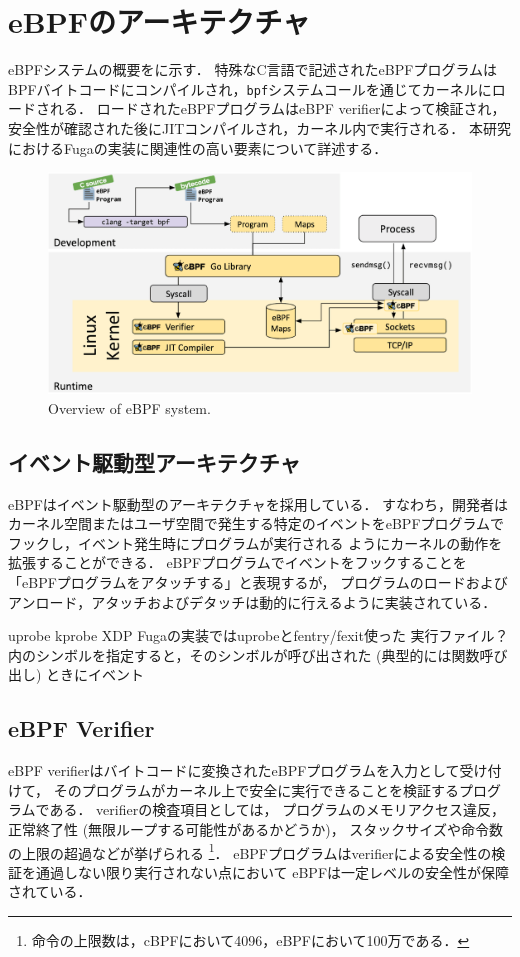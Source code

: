 \section{eBPFのアーキテクチャ}
eBPFシステムの概要をに示す．
特殊なC言語で記述されたeBPFプログラムはBPFバイトコードにコンパイルされ，\texttt{bpf}システムコールを通じてカーネルにロードされる．
ロードされたeBPFプログラムはeBPF verifierによって検証され，安全性が確認された後にJITコンパイルされ，カーネル内で実行される．
本研究におけるFugaの実装に関連性の高い要素について詳述する．
\begin{figure}[t]
  \begin{center}
    \includegraphics[width=0.8\columnwidth]{doc/img/ebpf-overview.eps}
  \end{center}
  \caption{Overview of eBPF system. \cite{WhatiseB81:online}}
  \label{fig:ebpf-overview}
\end{figure}

\subsection{イベント駆動型アーキテクチャ}
eBPFはイベント駆動型のアーキテクチャを採用している．
すなわち，開発者はカーネル空間またはユーザ空間で発生する特定のイベントをeBPFプログラムでフックし，イベント発生時にプログラムが実行される
ようにカーネルの動作を拡張することができる．
eBPFプログラムでイベントをフックすることを「eBPFプログラムをアタッチする」と表現するが，
プログラムのロードおよびアンロード，アタッチおよびデタッチは動的に行えるように実装されている．

uprobe kprobe XDP
Fugaの実装ではuprobeとfentry/fexit使った
実行ファイル？内のシンボルを指定すると，そのシンボルが呼び出された (典型的には関数呼び出し) ときにイベント

\subsection{eBPF Verifier}
eBPF verifierはバイトコードに変換されたeBPFプログラムを入力として受け付けて，
そのプログラムがカーネル上で安全に実行できることを検証するプログラムである．
verifierの検査項目としては，
プログラムのメモリアクセス違反，正常終了性 (無限ループする可能性があるかどうか)，
スタックサイズや命令数の上限の超過などが挙げられる
\footnote{命令の上限数は，cBPFにおいて4096，eBPFにおいて100万である．}．
eBPFプログラムはverifierによる安全性の検証を通過しない限り実行されない点において
eBPFは一定レベルの安全性が保障されている．


